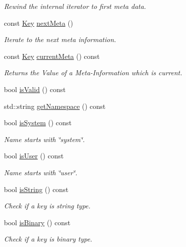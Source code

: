 \begin{DoxyCompactItemize}
\begin{DoxyCompactList}\small\item\em Rewind the internal iterator to first meta data.  \end{DoxyCompactList}\item 
const \hyperlink{classkdb_1_1Key}{Key} \hyperlink{classkdb_1_1Key_a855f37fef58a4ea4006d9e281f66cfe1}{next\-Meta} ()
\begin{DoxyCompactList}\small\item\em Iterate to the next meta information.  \end{DoxyCompactList}\item 
const \hyperlink{classkdb_1_1Key}{Key} \hyperlink{classkdb_1_1Key_a2be586ccd64cd280561ba5cd23f6ff1e}{current\-Meta} () const 
\begin{DoxyCompactList}\small\item\em Returns the Value of a Meta-\/\-Information which is current.  \end{DoxyCompactList}\item 
bool \hyperlink{classkdb_1_1Key_acbb13cfcabb4548177e86eec1ac16d87}{is\-Valid} () const 
\item 
std\-::string \hyperlink{classkdb_1_1Key_a2cf2b97f404d5808f46a9a5c4b8b93e1}{get\-Namespace} () const 
\item 
bool \hyperlink{classkdb_1_1Key_ac0f21b82a3d851eb3dfae53ddcfdbe48}{is\-System} () const 
\begin{DoxyCompactList}\small\item\em Name starts with \char`\"{}system\char`\"{}. \end{DoxyCompactList}\item 
bool \hyperlink{classkdb_1_1Key_ab6103772c702b400eaefbc4665f5c0cf}{is\-User} () const 
\begin{DoxyCompactList}\small\item\em Name starts with \char`\"{}user\char`\"{}. \end{DoxyCompactList}\item 
bool \hyperlink{classkdb_1_1Key_aa60e37609593de715c342740c76040cc}{is\-String} () const 
\begin{DoxyCompactList}\small\item\em Check if a key is string type.  \end{DoxyCompactList}\item 
bool \hyperlink{classkdb_1_1Key_aad92210fe2389ad950a47a4eca428574}{is\-Binary} () const 
\begin{DoxyCompactList}\small\item\em Check if a key is binary type.  \end{DoxyCompactList}\item 

\end{DoxyCompactItemize}
